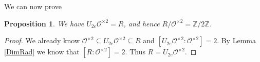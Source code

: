 \documentclass[10pt, letterpaper]{amsart}
\theoremstyle{plain}
\newtheorem{Prop}[equation]{Proposition}
\newtheorem{Lem}[equation]{Lemma}
\theoremstyle{definition}
\numberwithin{equation}{section}
\newcommand{\Z}{\mathbb{Z}}
\newcommand{\Ocal}{\mathcal{O}}
\begin{document}

We can now prove
\begin{Prop}
We have $U_{2e}\Ocal^{\times 2}= R$, and hence $R\slash\Ocal^{\times 2}=\Z\slash 2\Z$.
\end{Prop}
\begin{proof}
We already know $\Ocal^{\times 2}\subseteq U_{2e}\Ocal^{\times 2}\subseteq R$ and $[U_{2e}\Ocal^{\times 2}:\Ocal^{\times 2}]=2$. By Lemma \ref{DimRad} we know that $[R:\Ocal^{\times 2}]=2$. Thus $R=U_{2e}\Ocal^{\times 2}$.
\end{proof}
\end{document}
